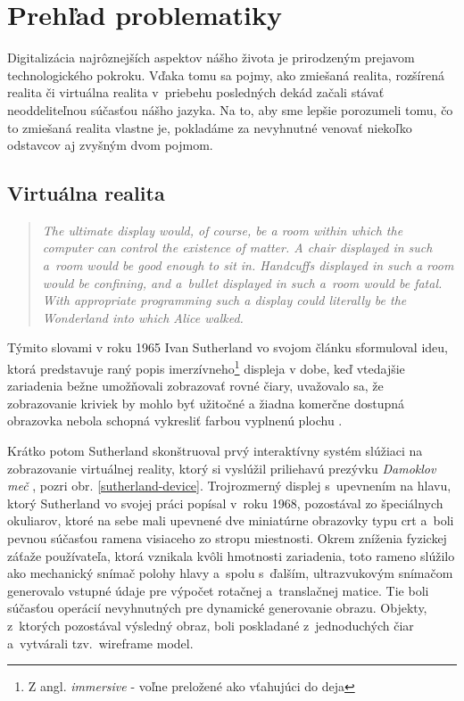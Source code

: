\section{Prehľad problematiky}
Digitalizácia najrôznejších aspektov nášho života je prirodzeným prejavom technologického pokroku. Vďaka tomu sa 
pojmy, ako zmiešaná realita, rozšírená realita či virtuálna realita v~priebehu posledných dekád začali stávať neoddeliteľnou súčasťou nášho jazyka. 
Na to, aby sme lepšie porozumeli tomu, čo to zmiešaná realita vlastne je, pokladáme za nevyhnutné venovať niekoľko odstavcov aj zvyšným dvom pojmom.

\subsection{Virtuálna realita}
\begin{quote}\itshape
  The ultimate display would, of course, be a room within which the computer can control the existence of matter. A chair displayed in such a~room 
  would be good enough to sit in. Handcuffs displayed in such a room would be confining, and a~bullet displayed in such a~room would be fatal. 
  With appropriate programming such a display could literally be the Wonderland into which Alice walked.
\end{quote}
Týmito slovami v roku 1965 Ivan Sutherland vo svojom článku \cite{sutherlandUltimateDisplay1965b} sformuloval ideu, ktorá predstavuje raný popis 
imerzívneho\footnote{Z angl. \emph{immersive} - voľne preložené ako vťahujúci do deja} displeja v dobe, keď vtedajšie zariadenia bežne umožňovali 
zobrazovať rovné čiary, uvažovalo sa, že zobrazovanie kriviek by mohlo byť užitočné a žiadna komerčne dostupná obrazovka nebola schopná vykresliť farbou 
vyplnenú plochu \cite{sutherlandUltimateDisplay1965b}. 

Krátko potom Sutherland skonštruoval prvý interaktívny systém slúžiaci na zobrazovanie virtuálnej reality, ktorý si vyslúžil priliehavú prezývku 
\emph{Damoklov meč} \cite[5]{schmalstiegAugmentedRealityPrinciples2016}, pozri obr. \ref{sutherland-device}. Trojrozmerný displej s~upevnením na hlavu, ktorý 
Sutherland vo svojej práci \cite{sutherlandHeadmountedThreeDimensional1968} popísal v~roku 1968, pozostával zo špeciálnych okuliarov, 
ktoré na sebe mali upevnené dve miniatúrne obrazovky typu \acrshort{crt} a~boli pevnou súčasťou ramena visiaceho zo stropu miestnosti. 
Okrem zníženia fyzickej záťaže používateľa, ktorá vznikala kvôli hmotnosti zariadenia, toto rameno slúžilo ako mechanický snímač polohy hlavy a~spolu s~ďalším, 
ultrazvukovým snímačom generovalo vstupné údaje pre výpočet rotačnej a~translačnej matice. Tie boli súčasťou operácií nevyhnutných pre dynamické generovanie obrazu. 
Objekty, z~ktorých pozostával výsledný obraz, boli poskladané z~jednoduchých čiar a~vytvárali tzv.~wireframe model.

